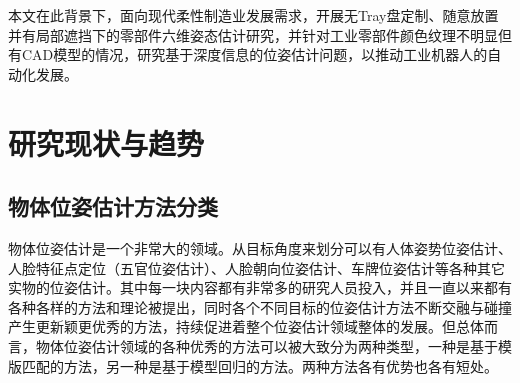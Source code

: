 本文在此背景下，面向现代柔性制造业发展需求，开展无Tray盘定制、随意放置并有局部遮挡下的零部件六维姿态估计研究，并针对工业零部件颜色纹理不明显但有CAD模型的情况，研究基于深度信息的位姿估计问题，以推动工业机器人的自动化发展。





\section{研究现状与趋势} 

\subsection{物体位姿估计方法分类} %


物体位姿估计是一个非常大的领域。从目标角度来划分可以有人体姿势位姿估计、人脸特征点定位（五官位姿估计）、人脸朝向位姿估计、车牌位姿估计等各种其它实物的位姿估计。其中每一块内容都有非常多的研究人员投入，并且一直以来都有各种各样的方法和理论被提出，同时各个不同目标的位姿估计方法不断交融与碰撞产生更新颖更优秀的方法，持续促进着整个位姿估计领域整体的发展。但总体而言，物体位姿估计领域的各种优秀的方法可以被大致分为两种类型，一种是基于模版匹配的方法，另一种是基于模型回归的方法。两种方法各有优势也各有短处。

